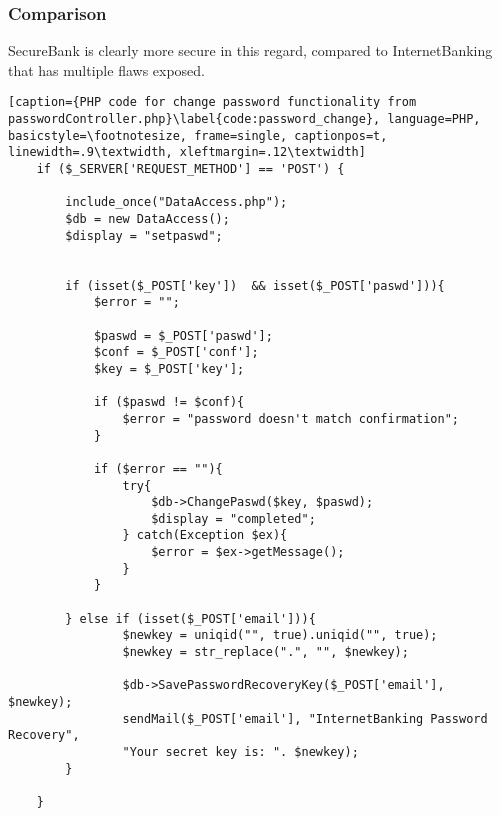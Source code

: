\subsubsection{Comparison}
SecureBank is clearly more secure in this regard, compared to InternetBanking that has multiple flaws exposed.

\begin{lstlisting}[caption={PHP code for change password functionality from passwordController.php}\label{code:password_change}, language=PHP, basicstyle=\footnotesize, frame=single, captionpos=t, linewidth=.9\textwidth, xleftmargin=.12\textwidth]
    if ($_SERVER['REQUEST_METHOD'] == 'POST') {

        include_once("DataAccess.php");
        $db = new DataAccess();
        $display = "setpaswd";


        if (isset($_POST['key'])  && isset($_POST['paswd'])){
            $error = "";

            $paswd = $_POST['paswd'];
            $conf = $_POST['conf'];
            $key = $_POST['key'];

            if ($paswd != $conf){
                $error = "password doesn't match confirmation";
            }

            if ($error == ""){
                try{
                    $db->ChangePaswd($key, $paswd);
                    $display = "completed";
                } catch(Exception $ex){
                    $error = $ex->getMessage();
                }
            }

        } else if (isset($_POST['email'])){
                $newkey = uniqid("", true).uniqid("", true);
                $newkey = str_replace(".", "", $newkey);

                $db->SavePasswordRecoveryKey($_POST['email'], $newkey);
                sendMail($_POST['email'], "InternetBanking Password Recovery",
                "Your secret key is: ". $newkey);
        }

    }
\end{lstlisting}

\clearpage